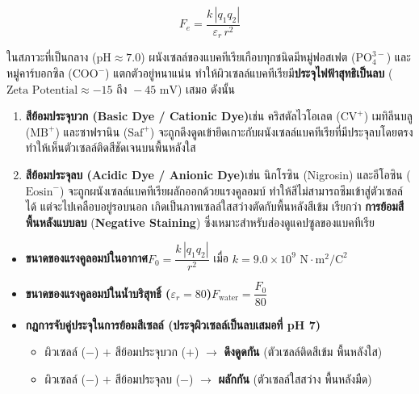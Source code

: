 \begin{equation}
    F_e = \frac{k\,|q_1 q_2|}{\varepsilon_r\,r^2}
    \label{eq:lab07_coulomb}
\end{equation}

ในสภาวะที่เป็นกลาง ($\text{pH} \approx 7.0$) ผนังเซลล์ของแบคทีเรียเกือบทุกชนิดมีหมู่ฟอสเฟต ($\text{PO}_4^{3-}$) และหมู่คาร์บอกซิล ($\text{COO}^-$) แตกตัวอยู่หนาแน่น ทำให้ผิวเซลล์แบคทีเรียมี\textbf{ประจุไฟฟ้าสุทธิเป็นลบ} ($\text{Zeta Potential} \approx -15\text{ ถึง }-45\text{ mV}$) เสมอ ดังนั้น
\begin{enumerate}
    \item \textbf{สีย้อมประจุบวก (Basic Dye / Cationic Dye)}\quad เช่น คริสตัลไวโอเลต ($\text{CV}^+$) เมทิลีนบลู ($\text{MB}^+$) และซาฟรานิน ($\text{Saf}^+$) จะถูกดึงดูดเข้ายึดเกาะกับผนังเซลล์แบคทีเรียที่มีประจุลบโดยตรง ทำให้เห็นตัวเซลล์ติดสีชัดเจนบนพื้นหลังใส
    \item \textbf{สีย้อมประจุลบ (Acidic Dye / Anionic Dye)}\quad เช่น นิกโรซิน (Nigrosin) และอีโอซิน ($\text{Eosin}^-$) จะถูกผนังเซลล์แบคทีเรียผลักออกด้วยแรงคูลอมบ์ ทำให้สีไม่สามารถซึมเข้าสู่ตัวเซลล์ได้ แต่จะไปเคลือบอยู่รอบนอก เกิดเป็นภาพเซลล์ใสสว่างตัดกับพื้นหลังสีเข้ม เรียกว่า \textbf{การย้อมสีพื้นหลังแบบลบ} (\textbf{Negative Staining}) ซึ่งเหมาะสำหรับส่องดูแคปซูลของแบคทีเรีย
\end{enumerate}

\begin{conceptbox}
\begin{itemize}
    \item \textbf{ขนาดของแรงคูลอมบ์ในอากาศ}\quad $F_0 = \dfrac{k\,|q_1 q_2|}{r^2}$ เมื่อ $k = 9.0 \times 10^9\text{ N}\cdot\text{m}^2/\text{C}^2$
    \item \textbf{ขนาดของแรงคูลอมบ์ในน้ำบริสุทธิ์ ($\varepsilon_r = 80$)}\quad $F_{\text{water}} = \dfrac{F_0}{80}$
    \item \textbf{กฎการจับคู่ประจุในการย้อมสีเซลล์ (ประจุผิวเซลล์เป็นลบเสมอที่ pH 7)}
    \begin{itemize}
        \item ผิวเซลล์ ($-$) $+$ สีย้อมประจุบวก ($+$) $\longrightarrow$ \textbf{ดึงดูดกัน} (ตัวเซลล์ติดสีเข้ม พื้นหลังใส)
        \item ผิวเซลล์ ($-$) $+$ สีย้อมประจุลบ ($-$) $\longrightarrow$ \textbf{ผลักกัน} (ตัวเซลล์ใสสว่าง พื้นหลังมืด)
    \end{itemize}
\end{itemize}
\end{conceptbox}

